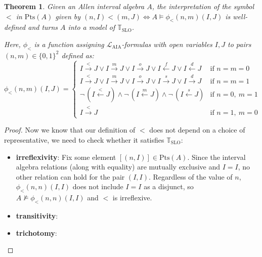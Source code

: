 \documentclass[11pt %
              ]{article}
\newcommand{\lang}{\mathcal{L}}
\newcommand{\theory}{\mathbb{T}}
\newcommand{\tslo}{\theory_\text{SLO}}
\newcommand{\laia}{\lang_\text{AIA}}
\newcommand{\before}{\overset{<}{\longrightarrow}}
\newcommand{\meets}{\overset{m}{\longrightarrow}}
\newcommand{\overlaps}{\overset{o}{\longrightarrow}}
\newcommand{\starts}{\overset{s}{\longrightarrow}}
\newcommand{\contained}{\overset{d}{\longrightarrow}}
\newcommand{\after}{\overset{<}{\longleftarrow}}
\newcommand{\metby}{\overset{m}{\longleftarrow}}
\newcommand{\startedby}{\overset{s}{\longleftarrow}}
\newcommand{\finishedby}{\overset{f}{\longleftarrow}}
\newcommand{\contains}{\overset{d}{\longleftarrow}}
\newcommand{\plt}{\phi_<}
\newcommand{\points}[1][-]{\text{Pts}\left(#1\right)}
\theoremstyle{plain}
\newtheorem{thm}{Theorem}%
\theoremstyle{definition}
\theoremstyle{remark}
\begin{document}
\begin{thm}
  Given an Allen interval algebra $A$, the interpretation of the symbol $<$ in $\points[A]$ given by
  $(n,I) < (m,J) \iff A \models \plt(n,m)(I,J)$ is well-defined and turns $A$ into a model of
  $\tslo$.

  Here, $\plt$ is a function assigning $\laia$-formulas with open variables $I,J$ to pairs
  $(n,m) \in \{0,1\}^2$ defined as:
  \begin{equation*}
    \plt(n,m)(I,J) = \begin{cases}
      I \before J \lor I \meets J \lor I \overlaps J  \lor I \finishedby J \lor I \contains J
                                                & \text{if } n = m = 0\\
        I \before J \lor I \meets J \lor I \overlaps J \lor I \starts J \lor I \contained J
                                                & \text{if } n = m = 1 \\
      \lnot\,(I \after J) \land \lnot\,(I \metby J) \land \lnot\,(I \startedby J)
                                                & \text{if } n = 0,\ m = 1 \\
      I \before J                               & \text{if } n = 1,\ m = 0
    \end{cases}
  \end{equation*}
\end{thm}
\begin{proof}

  Now we know that our definition of $<$ does not depend on a choice of representative, we need
  to check whether it satisfies $\tslo$:
  \begin{itemize}
    \item \textbf{irreflexivity}: Fix some element $[(n,I)] \in \points[A]$. Since the interval
      algebra relations (along with equality) are mutually exclusive and $I = I$, no other relation
      can hold for the pair $(I,I)$. Regardless of the value of $n$, $\plt(n,n)(I,I)$ does not
      include $I = I$ as a disjunct, so $A \not\models \plt(n,n)(I,I)$ and $<$ is irreflexive.
    \item \textbf{transitivity}:
    \item \textbf{trichotomy}:
  \end{itemize}
\end{proof}

\end{document}

